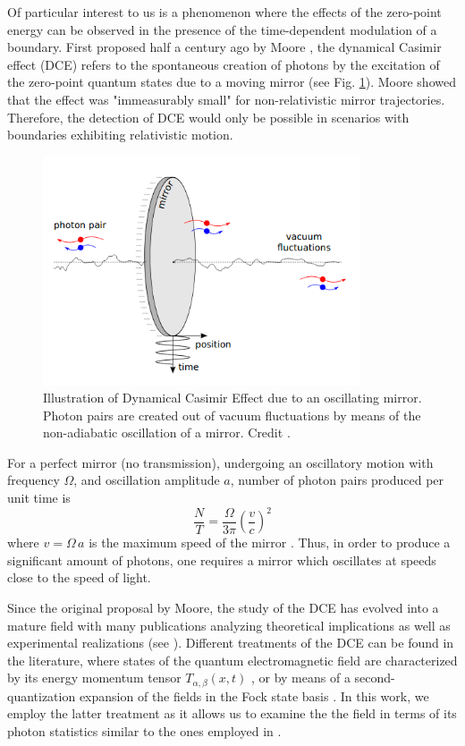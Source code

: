 Of particular interest to us is a phenomenon where the effects of the zero-point energy can be observed in the presence of the time-dependent modulation of a boundary. First proposed half a century ago by Moore \cite{Moore1970}, the dynamical Casimir effect (DCE) refers to the spontaneous creation of photons by the excitation of the zero-point quantum states due to a moving mirror (see Fig. \ref{fig:Nation_movingmiror}). Moore showed that the effect was "immeasurably small" for non-relativistic mirror trajectories. Therefore, the detection of DCE would only be possible in scenarios with boundaries exhibiting relativistic motion.
%
\begin{figure}[h]
    \centering
    \includegraphics[width = 3.7in, keepaspectratio]{figures/intro/Nation2011_DCE.png}
    \caption{Illustration of Dynamical Casimir Effect due to an oscillating mirror. Photon pairs are created out of vacuum fluctuations by means of the non-adiabatic oscillation of a mirror. Credit \protect\cite{Nation2011}.}
    \label{fig:Nation_movingmiror}
\end{figure}
\newpage
\noindent
For a perfect mirror (no transmission), undergoing an oscillatory motion with frequency $\Omega$, and oscillation amplitude $a$, number of photon pairs produced per unit time is
%
\begin{equation}
    \frac{N}{T} = \frac{\Omega}{3\pi}\left(\frac{v}{c}\right)^2 
\end{equation}
%
where $v = \Omega \, a$ is the maximum speed of the mirror \cite{Lambrecht1996}. Thus, in order to produce a significant amount of photons, one requires a mirror which oscillates at speeds close to the speed of light.

Since the original proposal by Moore, the study of the DCE has evolved into a mature field with many publications analyzing theoretical implications as well as experimental realizations (see \cite{Dodonov_Review2020}). Different treatments of the DCE can be found in the literature, where states of the quantum electromagnetic field are characterized by its energy momentum tensor $T_{\alpha, \beta}(x,t)$ \cite{Fulling&Davies1976}, or by means of a second-quantization expansion of the fields in the Fock state basis \cite{Dodonov1990}. In this work, we employ the latter treatment as it allows us to examine the the field in terms of its photon statistics similar to the ones employed in \cite{Dodonov1990,Lambrecht1996, Nation2011}.

